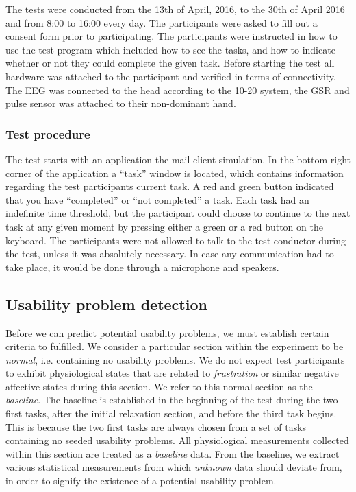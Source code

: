 The tests were conducted from the 13th of April, 2016, to the 30th of April 2016 and from 8:00 to 16:00 every day. 
The participants were asked to fill out a consent form prior to participating. 
The participants were instructed in how to use the test program which included how to see the tasks, and how to indicate whether or not they could complete the given task. 
Before starting the test all hardware was attached to the participant and verified in terms of connectivity. 
The EEG was connected to the head according to the 10-20 system\cite{eeg_tech_10_20}, the GSR and pulse sensor was attached to their non-dominant hand. 

\subsubsection{Test procedure}
The test starts with an application the mail client simulation.
In the bottom right corner of the application a ``task'' window is located, which contains information regarding the test participants current task. 
A red and green button indicated that you have ``completed'' or ``not completed'' a task.  
Each task had an indefinite time threshold, but the participant could choose to continue to the next task at any given moment by pressing either a green or a red button on the keyboard. 
The participants were not allowed to talk to the test conductor during the test, unless it was absolutely necessary. 
In case any communication had to take place, it would be done through a microphone and speakers.

\subsection{Usability problem detection}
Before we can predict potential usability problems, we must establish certain criteria to fulfilled.  We consider a
particular section within the experiment to be \textit{normal}, i.e. containing no usability problems.  We do not expect
test participants to exhibit physiological states that are related to \textit{frustration} or similar negative affective
states during this section. We refer to this normal section as the \textit{baseline}. The baseline is established in the
beginning of the test during the two first tasks, after the initial relaxation section, and before the third task
begins. This is because the two first tasks are always chosen from a set of tasks containing no seeded usability
problems. All physiological measurements collected within this section are treated as a \textit{baseline} data.  From
the baseline, we extract various statistical measurements from which \textit{unknown} data should deviate from, in order
to signify the existence of a potential usability problem.

